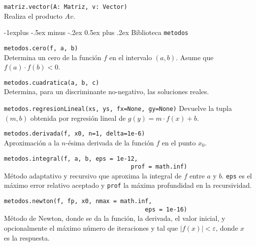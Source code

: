 \documentclass[10pt,landscape]{article}
\makeatletter
\renewcommand{\subsection}{\@startsection{subsection}{2}{0mm}%
                                {-1explus -.5ex minus -.2ex}%
                                {0.5ex plus .2ex}%
                                {\normalfont\normalsize\bfseries}}
\makeatother
\begin{document}
\begin{multicols}{3}
\begin{asparaitem}
\item \verb|matriz.vector(A: Matriz, v: Vector)| \\
  \quad Realiza el producto $Av$.
\end{asparaitem}


\subsection{Biblioteca \texttt{metodos}}


\begin{asparaitem}
\item \verb|metodos.cero(f, a, b)| \\
  Determina un cero de la funci\'on $f$ en el intervalo $(a, b)$. Asume que $f(a)\cdot f(b) < 0$.

\item \verb|metodos.cuadratica(a, b, c)|\\
  \quad Determina, para un discriminante no-negativo, las soluciones reales.

\item \verb|metodos.regresionLineal(xs, ys, fx=None, gy=None)|
  \quad Devuelve la tupla $(m, b)$ obtenida por regresi\'on lineal de $g(y) = m\cdot f(x) + b$.

\item \verb|metodos.derivada(f, x0, n=1, delta=1e-6)| \\
  \quad Aproximaci\'on a la $n$-\'esima derivada de la funci\'on $f$ en el punto $x_0$.

\item \verb|metodos.integral(f, a, b, eps = 1e-12,|\\
  \verb|                                    prof = math.inf)| \\
  \quad M\'etodo adaptativo y recursivo que aproxima la integral de $f$ entre $a$ y $b$. \verb|eps| es el m\'aximo error relativo aceptado y \verb|prof| la m\'axima profundidad en la recursividad.

\item \verb|metodos.newton(f, fp, x0, nmax = math.inf,|\\
  \verb|                                        eps = 1e-16)|\\
  \quad M\'etodo de Newton, donde se da la funci\'on, la derivada, el valor inicial, y opcionalmente el m\'aximo n\'umero de iteraciones y tal que $|f(x)|<\varepsilon$, donde $x$ es la respuesta.


\end{asparaitem}
\end{multicols}
\end{document}
